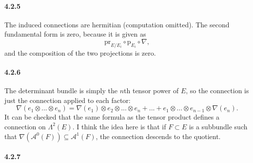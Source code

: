 \documentclass[10pt,letter]{article}
\begin{document}
\paragraph*{4.2.5} The induced connections are hermitian (computation omitted). The second fundamental form is zero, because it is given as 
\[ \text{pr}_{E/E_i} \circ \text{p}_{E_i} \circ \nabla,\]
and the composition of the two projections is zero. 
\paragraph*{4.2.6} The determinant bundle is simply the $n$th tensor power of $E$, so the connection is just the connection applied to each factor:
\[ \nabla(e_1 \otimes ... \otimes e_n) = \nabla(e_1) \otimes e_2 \otimes ... \otimes e_n + ... + e_1 \otimes ... \otimes e_{n-1} \otimes \nabla(e_n).\] 
It can be checked that the same formula as the tensor product defines a connection on $\Lambda^2(E)$. I think the idea here is that if $F \subset E$ is a subbundle such that $\nabla(\mathcal{A}^0(F)) \subseteq \mathcal{A}^1(F)$, the connection descends to the quotient. 
\paragraph*{4.2.7} 
\end{document}
